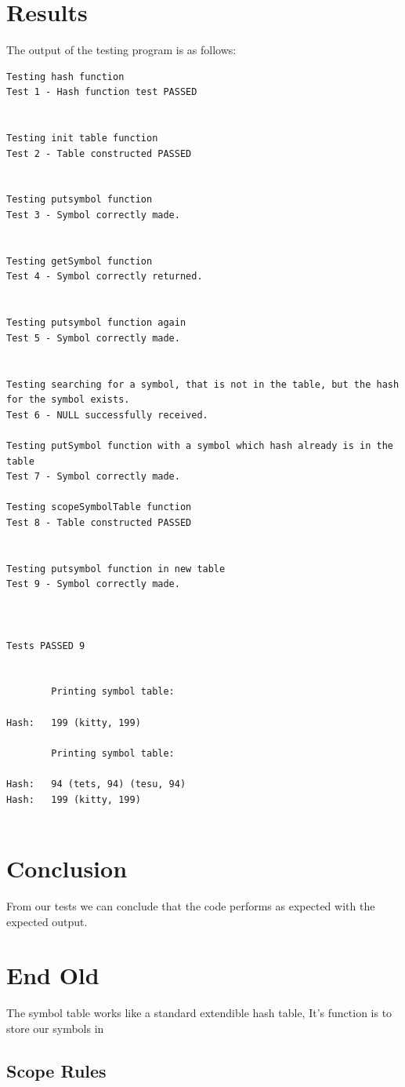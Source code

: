\documentclass[a4paper,10pt,titlepage]{report}
\begin{document}
\section{Results}
The output of the testing program is as follows:
\begin{lstlisting}
Testing hash function
Test 1 - Hash function test PASSED


Testing init table function
Test 2 - Table constructed PASSED


Testing putsymbol function
Test 3 - Symbol correctly made.


Testing getSymbol function
Test 4 - Symbol correctly returned.


Testing putsymbol function again
Test 5 - Symbol correctly made.


Testing searching for a symbol, that is not in the table, but the hash for the symbol exists.
Test 6 - NULL successfully received.

Testing putSymbol function with a symbol which hash already is in the table
Test 7 - Symbol correctly made.

Testing scopeSymbolTable function
Test 8 - Table constructed PASSED


Testing putsymbol function in new table
Test 9 - Symbol correctly made.


 
Tests PASSED 9

 
		Printing symbol table:

Hash: 	199 (kitty, 199) 

		Printing symbol table:

Hash: 	94 (tets, 94) (tesu, 94) 
Hash: 	199 (kitty, 199) 


\end{lstlisting}

\section{Conclusion}
From our tests we can conclude that the code performs as expected with the expected output.


\section{End Old}

The symbol table works like a standard extendible hash table, It's function is to store our symbols in
\subsection{Scope Rules}
\end{document}
